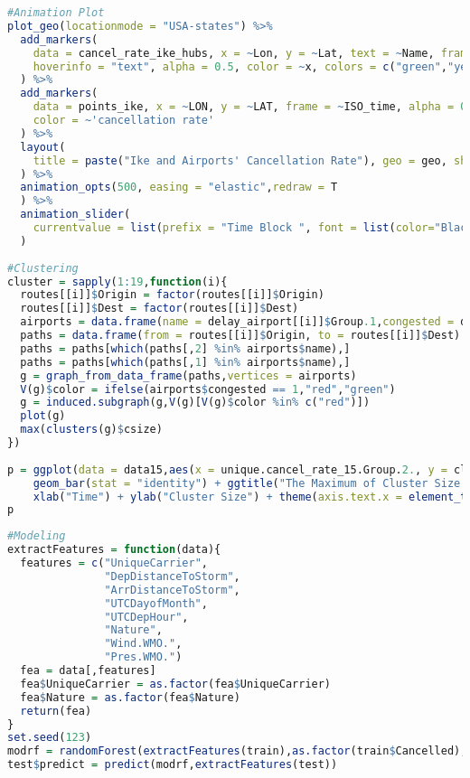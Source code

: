 \documentclass[12pt]{article}
\begin{document}
\begin{lstlisting}[language=R, caption=Animation Plot in R]
#Animation Plot
plot_geo(locationmode = "USA-states") %>%
  add_markers(
    data = cancel_rate_ike_hubs, x = ~Lon, y = ~Lat, text = ~Name, frame = ~Group.2,
    hoverinfo = "text", alpha = 0.5, color = ~x, colors = c("green","yellow","orange","red","maroon")
  ) %>% 
  add_markers(
    data = points_ike, x = ~LON, y = ~LAT, frame = ~ISO_time, alpha = 0.3, size = ~INTENSITY, 
    color = ~'cancellation rate'
  ) %>%
  layout(
    title = paste("Ike and Airports' Cancellation Rate"), geo = geo, showlegend = FALSE
  ) %>%
  animation_opts(500, easing = "elastic",redraw = T
  ) %>%
  animation_slider(
    currentvalue = list(prefix = "Time Block ", font = list(color="Black"))
  )
 
#Clustering
cluster = sapply(1:19,function(i){
  routes[[i]]$Origin = factor(routes[[i]]$Origin)
  routes[[i]]$Dest = factor(routes[[i]]$Dest)
  airports = data.frame(name = delay_airport[[i]]$Group.1,congested = delay_airport[[i]]$congested)
  paths = data.frame(from = routes[[i]]$Origin, to = routes[[i]]$Dest)
  paths = paths[which(paths[,2] %in% airports$name),]
  paths = paths[which(paths[,1] %in% airports$name),]
  g = graph_from_data_frame(paths,vertices = airports)
  V(g)$color = ifelse(airports$congested == 1,"red","green")
  g = induced.subgraph(g,V(g)[V(g)$color %in% c("red")])
  plot(g)
  max(clusters(g)$csize)
})
 
p = ggplot(data = data15,aes(x = unique.cancel_rate_15.Group.2., y = cluster_15)) + 
    geom_bar(stat = "identity") + ggtitle("The Maximum of Cluster Size at Different Time of OCT 15") +
    xlab("Time") + ylab("Cluster Size") + theme(axis.text.x = element_text(angle = 90, hjust = 1))
p
\end{lstlisting}
\begin{lstlisting}[language=R, caption=Random Forest in R] 
#Modeling
extractFeatures = function(data){
  features = c("UniqueCarrier",
               "DepDistanceToStorm",
               "ArrDistanceToStorm",
               "UTCDayofMonth",
               "UTCDepHour",
               "Nature",
               "Wind.WMO.",
               "Pres.WMO.")
  fea = data[,features]
  fea$UniqueCarrier = as.factor(fea$UniqueCarrier)
  fea$Nature = as.factor(fea$Nature)
  return(fea)
}
set.seed(123)
modrf = randomForest(extractFeatures(train),as.factor(train$Cancelled),ntree = 1000,importance = T)
test$predict = predict(modrf,extractFeatures(test))
\end{lstlisting}
\lstlistoflistings
\end{document}
